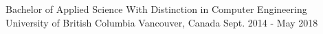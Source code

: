 

\begin{cventries}

  \cventry
    {Bachelor of Applied Science With Distinction in Computer Engineering} %
    {University of British Columbia} %
    {Vancouver, Canada} %
    {Sept. 2014 - May 2018} %
    {
    }

\end{cventries}
